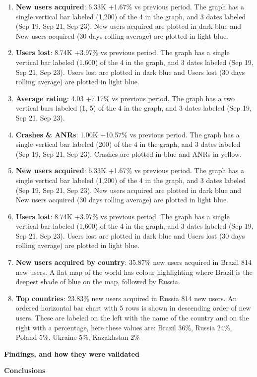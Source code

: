 \begin{enumerate}
    \item \textbf{New users acquired}: 6.33K +1.67\% vs previous period. The graph has a single vertical bar labeled (1,200) of the 4 in the graph, and 3 dates labeled (Sep 19, Sep 21, Sep 23). New users acquired are plotted in dark blue and New users acquired (30 days rolling average) are plotted in light blue.
    \item \textbf{Users lost}: 8.74K +3.97\% vs previous period. The graph has a single vertical bar labeled (1,600) of the 4 in the graph, and 3 dates labeled (Sep 19, Sep 21, Sep 23). Users lost are plotted in dark blue and Users lost (30 days rolling average) are plotted in light blue.
    \item \textbf{Average rating}: 4.03 +7.17\% vs previous period. The graph has a two vertical bars labeled (1, 5) of the 4 in the graph, and 3 dates labeled (Sep 19, Sep 21, Sep 23).
    \item \textbf{Crashes \& ANRs}: 1.00K +10.57\% vs previous period. The graph has a single vertical bar labeled (200) of the 4 in the graph, and 3 dates labeled (Sep 19, Sep 21, Sep 23). Crashes are plotted in blue and ANRs in yellow.
    \item \textbf{New users acquired}: 6.33K +1.67\% vs previous period. The graph has a single vertical bar labeled (1,200) of the 4 in the graph, and 3 dates labeled (Sep 19, Sep 21, Sep 23). New users acquired are plotted in dark blue and New users acquired (30 days rolling average) are plotted in light blue.
    \item \textbf{Users lost}: 8.74K +3.97\% vs previous period. The graph has a single vertical bar labeled (1,600) of the 4 in the graph, and 3 dates labeled (Sep 19, Sep 21, Sep 23). Users lost are plotted in dark blue and Users lost (30 days rolling average) are plotted in light blue.
    \item \textbf{New users acquired by country}: 35.87\% new users acquired in Brazil 814 new users. A flat map of the world has colour highlighting where Brazil is the deepest shade of blue on the map, followed by Russia.
    \item \textbf{Top countries}: 23.83\% new users acquired in Russia 814 new users. An ordered horizontal bar chart with 5 rows is shown in descending order of new users. These are labeled on the left with the name of the country and on the right with a percentage, here these values are: Brazil 36\%, Russia 24\%, Poland 5\%, Ukraine 5\%, Kazakhstan 2\%
    
\end{enumerate}

\textbf{Findings, and how they were validated}

\textbf{Conclusions}